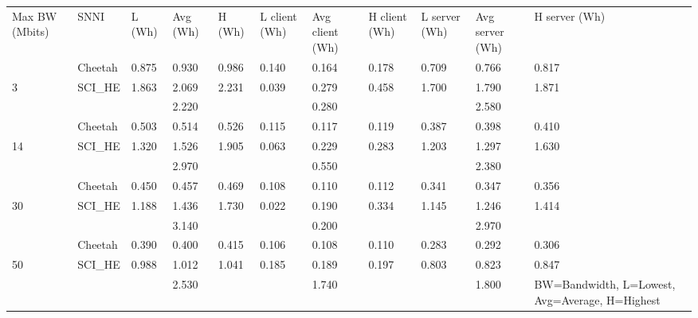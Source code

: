 \begin{tabular}{lllllllllll}
Max BW (Mbits) & SNNI    & L (Wh) & Avg (Wh) & H (Wh) & L client (Wh) & Avg client (Wh) & H client (Wh) & L server (Wh) & Avg server (Wh) & H server (Wh) \\
               & Cheetah & 0.875  & 0.930    & 0.986  & 0.140         & 0.164           & 0.178         & 0.709         & 0.766           & 0.817         \\
3              & SCI\_HE & 1.863  & 2.069    & 2.231  & 0.039         & 0.279           & 0.458         & 1.700         & 1.790           & 1.871         \\
               &         &        & 2.220    &        &               & 0.280           &               &               & 2.580           &               \\
               & Cheetah & 0.503  & 0.514    & 0.526  & 0.115         & 0.117           & 0.119         & 0.387         & 0.398           & 0.410         \\
14             & SCI\_HE & 1.320  & 1.526    & 1.905  & 0.063         & 0.229           & 0.283         & 1.203         & 1.297           & 1.630         \\
               &         &        & 2.970    &        &               & 0.550           &               &               & 2.380           &               \\
               & Cheetah & 0.450  & 0.457    & 0.469  & 0.108         & 0.110           & 0.112         & 0.341         & 0.347           & 0.356         \\
30             & SCI\_HE & 1.188  & 1.436    & 1.730  & 0.022         & 0.190           & 0.334         & 1.145         & 1.246           & 1.414         \\
               &         &        & 3.140    &        &               & 0.200           &               &               & 2.970           &               \\
               & Cheetah & 0.390  & 0.400    & 0.415  & 0.106         & 0.108           & 0.110         & 0.283         & 0.292           & 0.306         \\
50             & SCI\_HE & 0.988  & 1.012    & 1.041  & 0.185         & 0.189           & 0.197         & 0.803         & 0.823           & 0.847         \\
               &         &        & 2.530    &        &               & 1.740           &               &               & 1.800           &              
\multicolumn{11}{l}{BW=Bandwidth, L=Lowest, Avg=Average, H=Highest}   
\end{tabular}
